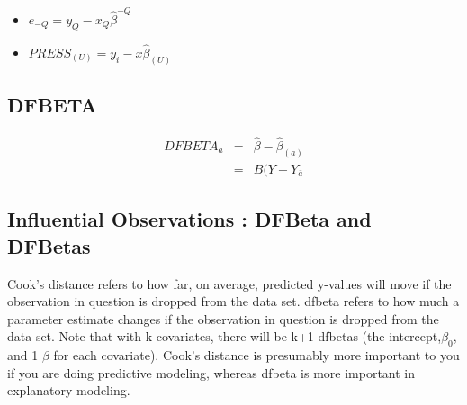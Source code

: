 \documentclass[Main.tex]{subfiles}
\begin{document}
\begin{itemize}
	\item $e_{-Q} = y_{Q} - x_{Q}\hat{\beta}^{-Q}$
	\item $PRESS_{(U)} = y_{i} - x\hat{\beta}_{(U)}$
\end{itemize}

\subsection{DFBETA} %
\begin{eqnarray}
	DFBETA_{a} &=& \hat{\beta} - \hat{\beta}_{(a)} \\
	&=& B(Y-Y_{\bar{a}}
\end{eqnarray}

\subsection{Influential Observations : DFBeta and DFBetas}
Cook's distance refers to how far, on average, predicted y-values will move if the observation in question is dropped from the data set. dfbeta refers to how much a parameter estimate changes if the observation in question is dropped from the data set. Note that with k covariates, there will be k+1 dfbetas (the intercept,$\beta_0$, and 1 $\beta$ for each covariate). Cook's distance is presumably more important to you if you are doing predictive modeling, whereas dfbeta is more important in explanatory modeling.


\newpage


\newpage
\end{document}
